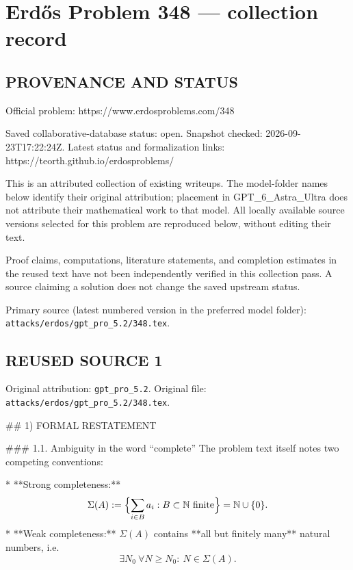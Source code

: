 \section*{Erd\H{o}s Problem 348 --- collection record}

\subsection*{PROVENANCE AND STATUS}
Official problem: https://www.erdosproblems.com/348

Saved collaborative-database status: open.
Snapshot checked: 2026-09-23T17:22:24Z.
Latest status and formalization links: https://teorth.github.io/erdosproblems/

This is an attributed collection of existing writeups. The model-folder names below identify their original attribution; placement in GPT\_6\_Astra\_Ultra does not attribute their mathematical work to that model. All locally available source versions selected for this problem are reproduced below, without editing their text.

Proof claims, computations, literature statements, and completion estimates in the reused text have not been independently verified in this collection pass. A source claiming a solution does not change the saved upstream status.

Primary source (latest numbered version in the preferred model folder): \texttt{attacks/erdos/gpt\_pro\_5.2/348.tex}.

\subsection*{REUSED SOURCE 1}
Original attribution: \texttt{gpt\_pro\_5.2}.
Original file: \texttt{attacks/erdos/gpt\_pro\_5.2/348.tex}.


## 1) FORMAL RESTATEMENT

### 1.1. Ambiguity in the word “complete”
The problem text itself notes two competing conventions:

* **Strong completeness:**
  \[
  \Sigma(A):=\Bigl\{\sum_{i\in B} a_i : B\subset \mathbb N\text{ finite}\Bigr\}=\mathbb N\cup\{0\}.
  \]
* **Weak completeness:** \(\Sigma(A)\) contains **all but finitely many** natural numbers, i.e.
  \[
  \exists N_0\ \forall N\ge N_0:\ N\in\Sigma(A).
  \]

